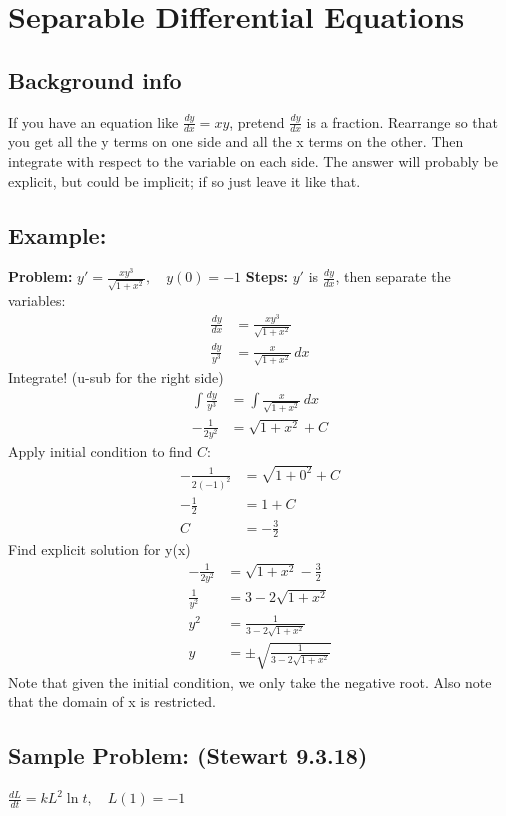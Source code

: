 \documentclass{article}
\begin{document}
\hypertarget{separableSolve}{
  \section*{Separable Differential Equations}
  \subsection*{Background info} 
  If you have an equation like $\frac{dy}{dx} = xy$, pretend $\frac{dy}{dx}$ is a fraction. Rearrange so that you get all the y terms on one side and all the x terms on the other. Then integrate with respect to the variable on each side. The answer will probably be explicit, but could be implicit; if so just leave it like that.
  \subsection*{Example:}
  \textbf{Problem:}\newline
  $y' = \frac{xy^3}{\sqrt{1+x^2}}, \quad y(0) = -1$ \newline
  \textbf{Steps:}\newline
  $y'$ is $\frac{dy}{dx}$, then separate the variables:
	\begin{align*}
	\frac{dy}{dx} &= \frac{xy^3}{\sqrt{1+x^2}} \\
	\frac{dy}{y^3} &= \frac{x}{\sqrt{1+x^2}} \, dx 
	\end{align*}
	Integrate! (u-sub for the right side)
	\begin{align*}
	\int \frac{dy}{y^3} &= \int \frac{x}{\sqrt{1+x^2}} \, dx \\
	-\frac{1}{2y^2} &= \sqrt{1+x^2} + C 
	\end{align*}
	Apply initial condition to find $C$:
	\begin{align*}
	-\frac{1}{2(-1)^2} &= \sqrt{1+0^2} + C \\
	-\frac{1}{2} &= 1 + C \\
	C &= -\frac{3}{2}
	\end{align*}
	Find explicit solution for y(x)
	\begin{align*}
	-\frac{1}{2y^2} &= \sqrt{1+x^2} - \frac{3}{2} \\
	\frac{1}{y^2} &= 3 - 2\sqrt{1+x^2} \\
	y^2 &= \frac{1}{3 - 2\sqrt{1+x^2}} \\
	y &= \pm \sqrt{\frac{1}{3 - 2\sqrt{1+x^2}}}
	\end{align*}
	Note that given the initial condition, we only take the negative root. Also note that the domain of x is restricted.
  \subsection*{Sample Problem: (Stewart 9.3.18)}
  $\frac{dL}{dt} = kL^2 \ln t, \quad L(1) = -1$ 
}
\end{document}
